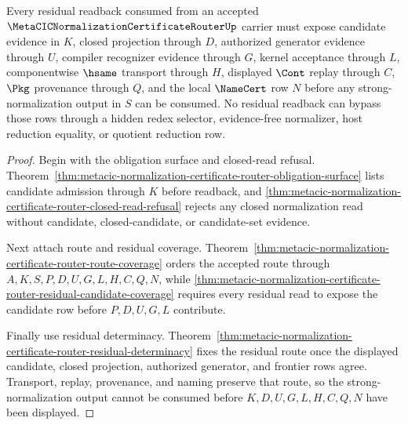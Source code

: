 \begin{theorem}
\label{thm:metacic-normalization-certificate-router-residual-readback-boundary}
Every residual readback consumed from an accepted $\MetaCICNormalizationCertificateRouterUp$ carrier must expose candidate evidence in $K$, closed projection through $D$, authorized generator evidence through $U$, compiler recognizer evidence through $G$, kernel acceptance through $L$, componentwise $\hsame$ transport through $H$, displayed $\Cont$ replay through $C$, $\Pkg$ provenance through $Q$, and the local $\NameCert$ row $N$ before any strong-normalization output in $S$ can be consumed. No residual readback can bypass those rows through a hidden redex selector, evidence-free normalizer, host reduction equality, or quotient reduction row.
\end{theorem}
\begin{proof}
Begin with the obligation surface and closed-read refusal. Theorem~\ref{thm:metacic-normalization-certificate-router-obligation-surface} lists candidate admission through $K$ before readback, and \autoref{thm:metacic-normalization-certificate-router-closed-read-refusal} rejects any closed normalization read without candidate, closed-candidate, or candidate-set evidence.

Next attach route and residual coverage. Theorem~\ref{thm:metacic-normalization-certificate-router-route-coverage} orders the accepted route through $A,K,S,P,D,U,G,L,H,C,Q,N$, while \autoref{thm:metacic-normalization-certificate-router-residual-candidate-coverage} requires every residual read to expose the candidate row before $P,D,U,G,L$ contribute.

Finally use residual determinacy. Theorem~\ref{thm:metacic-normalization-certificate-router-residual-determinacy} fixes the residual route once the displayed candidate, closed projection, authorized generator, and frontier rows agree. Transport, replay, provenance, and naming preserve that route, so the strong-normalization output cannot be consumed before $K,D,U,G,L,H,C,Q,N$ have been displayed.
\end{proof}

